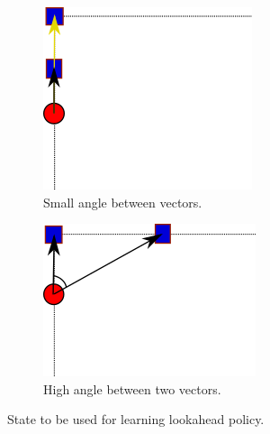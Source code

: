 \documentclass[hidelinks,BTech]{iitmdiss}
\begin{document}
\begin{figure}[H]
  \centering
  \begin{subfigure}[t]{0.3\textwidth}
  \includegraphics[width=\textwidth]{PurePursuit_low.png}
      \caption{Small angle between vectors.}
  \end{subfigure}
  \begin{subfigure}[t]{0.35\textwidth}
    \centering
      \includegraphics[width=\textwidth]{PurePursuit_high.png}
      \caption{High angle between two vectors.}
  \end{subfigure}
    \caption{State to be used for learning lookahead policy.}
\end{figure}
\end{document}
